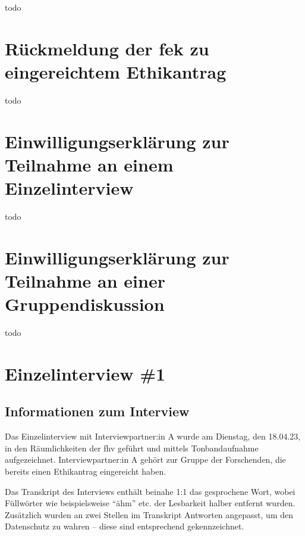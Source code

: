 \documentclass[a4paper,12pt,twoside]{scrreprt}
\begin{document}
todo



\chapter{Rückmeldung der \acs{fek} zu eingereichtem Ethikantrag}
\label{appendix:rückmeldung-fek}

todo



\chapter{Einwilligungserklärung zur Teilnahme an einem Einzelinterview}
\label{appendix:informed-consent-einzelinterview}

todo



\chapter{Einwilligungserklärung zur Teilnahme an einer Gruppendiskussion}
\label{appendix:informed-consent-gruppendiskussion}

todo



\chapter{Einzelinterview \#1}
\label{appendix:interview-1}

\section{Informationen zum Interview}
\label{appendix:interview-1-infos}

Das Einzelinterview mit Interviewpartner:in A wurde am Dienstag, den 18.04.23, in den Räumlichkeiten der \ac{fhv} geführt und mittels Tonbandaufnahme aufgezeichnet. Interviewpartner:in A gehört zur Gruppe der Forschenden, die bereits einen Ethikantrag eingereicht haben.

Das Transkript des Interviews enthält beinahe 1:1 das gesprochene Wort, wobei Füllwörter wie beispielsweise \enquote{ähm} etc. der Lesbarkeit halber entfernt wurden. Zusätzlich wurden an zwei Stellen im Transkript Antworten angepasst, um den Datenschutz zu wahren -- diese sind entsprechend gekennzeichnet.
\end{document}
